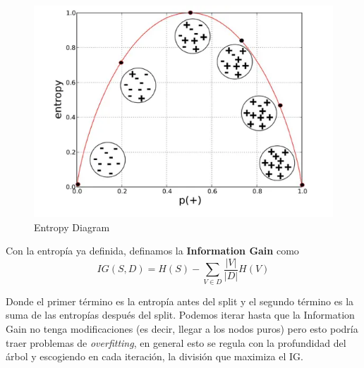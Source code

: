 \begin{figure}[H]
    \center
    \includegraphics[scale=0.3]{notebooks/ML/img/entropy_diagram.png}
    \caption{Entropy Diagram}
\end{figure}

Con la entropía ya definida, definamos la \textbf{Information Gain} como 
$$IG(S,D) = H(S) - \sum_{V \in D}\frac{|V|}{|D|}H(V)$$

Donde el primer término es la entropía antes del split y el segundo término es la suma de las entropías después del split. Podemos iterar hasta que la Information Gain no tenga modificaciones (es decir, llegar a los nodos puros) pero esto podría traer problemas de \textit{overfitting}, en general esto se regula con la profundidad del árbol y escogiendo en cada iteración, la división que maximiza el IG. 

